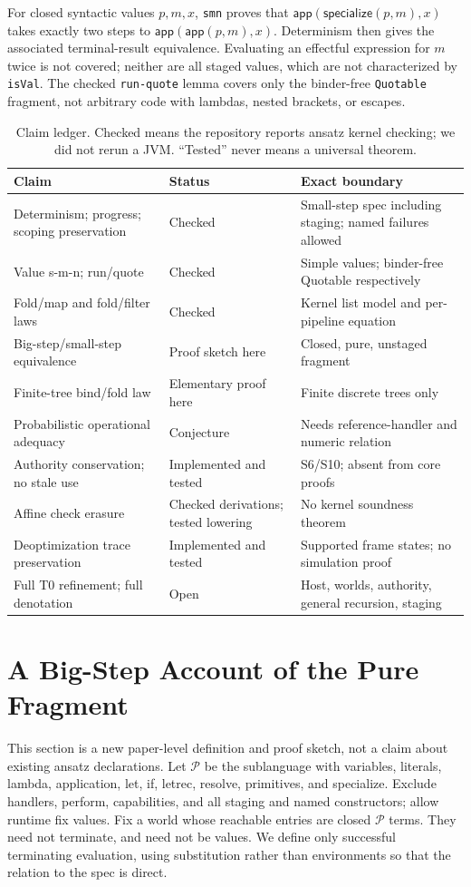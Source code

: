 \documentclass[acmsmall,screen,review,nonacm]{acmart}
\newcommand{\kw}[1]{\mathsf{#1}}
\newcommand{\app}[2]{\kw{app}(#1,#2)}
\newcommand{\src}[1]{{\normalfont\nolinkurl{#1}}}
\begin{document}
For closed syntactic values $p,m,x$, \src{smn} proves that
$\app{\kw{specialize}(p,m)}x$ takes exactly two steps to $\app{\app p m}x$.
Determinism then gives the associated terminal-result equivalence. Evaluating
an effectful expression for $m$ twice is not covered; neither are all staged
values, which are not characterized by \src{isVal}. The checked \src{run-quote}
lemma covers only the binder-free \src{Quotable} fragment, not arbitrary code
with lambdas, nested brackets, or escapes.

\begin{table}[t]
\caption{Claim ledger. Checked means the repository reports ansatz kernel checking;
we did not rerun a JVM. ``Tested'' never means a universal theorem.}
\label{tab:status}
\small
\begin{tabular}{L{.32\linewidth}L{.21\linewidth}L{.37\linewidth}}
\toprule Claim & Status & Exact boundary\\\midrule
Determinism; progress; scoping preservation & Checked & Small-step spec including staging; named failures allowed\\
Value s-m-n; run/quote & Checked & Simple values; binder-free Quotable respectively\\
Fold/map and fold/filter laws & Checked & Kernel list model and per-pipeline equation\\
Big-step/small-step equivalence & Proof sketch here & Closed, pure, unstaged fragment\\
Finite-tree bind/fold law & Elementary proof here & Finite discrete trees only\\
Probabilistic operational adequacy & Conjecture & Needs reference-handler and numeric relation\\
Authority conservation; no stale use & Implemented and tested & S6/S10; absent from core proofs\\
Affine check erasure & Checked derivations; tested lowering & No kernel soundness theorem\\
Deoptimization trace preservation & Implemented and tested & Supported frame states; no simulation proof\\
Full T0 refinement; full denotation & Open & Host, worlds, authority, general recursion, staging\\
\bottomrule
\end{tabular}
\end{table}

\section{A Big-Step Account of the Pure Fragment}\label{sec:big}
This section is a new paper-level definition and proof sketch, not a claim
about existing ansatz declarations. Let $\mathcal P$ be the sublanguage with
variables, literals, lambda, application, let, if, letrec, resolve, primitives,
and specialize. Exclude handlers, perform, capabilities, and all staging and
named constructors; allow runtime fix values. Fix a world whose reachable
entries are closed $\mathcal P$ terms. They need not terminate, and need not
be values. We define only successful terminating evaluation, using substitution
rather than environments so that the relation to the spec is direct.
\end{document}
